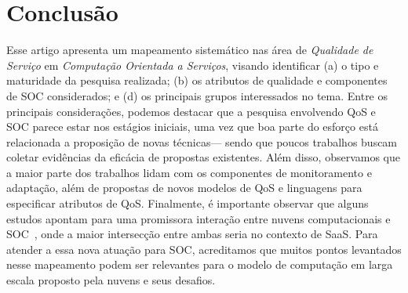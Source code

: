 \section{Conclus\~{a}o}\label{sec:conclusao}

Esse artigo apresenta um mapeamento sistem\'{a}tico nas \'{a}rea 
de \emph{Qualidade de Servi\c co} em \emph{Computa\c c\~{a}o Orientada a Servi\c cos}, visando identificar 
(a) o tipo e maturidade da pesquisa realizada; (b) os atributos de qualidade e componentes de SOC considerados; 
e (d) os principais grupos interessados no tema. Entre os principais considera\c c\~{o}es, podemos destacar que 
a pesquisa envolvendo QoS e SOC parece estar nos est\'{a}gios iniciais, uma vez que boa parte do esfor\c co est\'{a} 
relacionada a proposi\c c\~{a}o de novas t\'{e}cnicas--- sendo que poucos trabalhos buscam coletar evid\^{e}ncias 
da efic\'{a}cia de propostas existentes.  Al\'{e}m disso, observamos que a maior parte dos trabalhos lidam com 
os componentes de monitoramento e adapta\c c\~{a}o, al\'{e}m de propostas de novos modelos de QoS e linguagens para 
especificar atributos de QoS. 
Finalmente, \'{e} importante observar que alguns estudos apontam para uma promissora intera\c{c}\~{a}o entre nuvens computacionais e SOC~\cite{10.1109/MIC.2010.147}, onde a maior intersec\c{c}\~{a}o entre ambas seria no contexto de SaaS. Para atender a essa nova atua\c{c}\~{a}o para SOC, acreditamos que muitos pontos levantados nesse mapeamento podem ser relevantes para o modelo de computa\c{c}\~{a}o em larga escala proposto pela nuvens e seus desafios.
